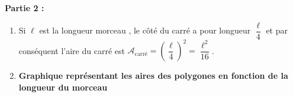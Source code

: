 \medskip

\textbf{Partie 2 :}

\medskip 

%

\begin{enumerate}
\item %
Si $\ell$ est la longueur  \og morceau  \fg{}, le côté du carré a pour longueur $\dfrac{\ell}{4}$ et par conséquent l'aire du carré est $\mathcal{A}_{\text{carré}} = \left(\dfrac{\ell}{4} \right)^2 = \dfrac{\ell^2}{16}$. 
\item %

%
\textbf{Graphique représentant les aires des polygones en fonction de la longueur du \og morceau  \fg }


\end{enumerate}
